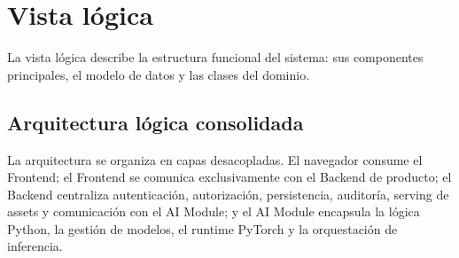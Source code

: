 \section{Vista lógica}

La vista lógica describe la estructura funcional del sistema: sus componentes principales, el modelo de datos y las clases del dominio.

\subsection{Arquitectura lógica consolidada}

La arquitectura se organiza en capas desacopladas. El navegador consume el Frontend; el Frontend se comunica exclusivamente con el Backend de producto; el Backend centraliza autenticación, autorización, persistencia, auditoría, serving de assets y comunicación con el AI Module; y el AI Module encapsula la lógica Python, la gestión de modelos, el runtime PyTorch y la orquestación de inferencia.

